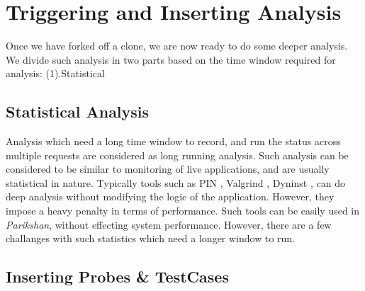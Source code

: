 \section{Triggering and Inserting Analysis}
\label{sec:trigger}

Once we have forked off a clone, we are now ready to do some deeper analysis. 
We divide such analysis in two parts based on the time window required for analysis: (1).Statistical

\subsection{Statistical Analysis}
\label{sec:statisticalTests}

Analysis which need a long time window to record, and run the status across multiple requests are considered as long running analysis. 
Such analysis can be considered to be similar to monitoring of live applications, and are usually statistical in nature.
Typically tools such as PIN \cite{pin}, Valgrind \cite{valgrind}, Dyninst \cite{dyninst}, can do deep analysis without modifying the logic of the application.
However, they impose a heavy penalty in terms of performance.
Such tools can be easily used in \textit{Parikshan}, without effecting system performance.
However, there are a few challanges with such statistics which need a longer window to run.

\subsection{Inserting Probes \& TestCases}
\label{sec:unitTests}
